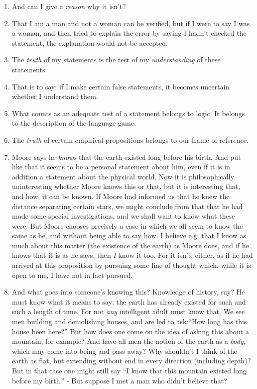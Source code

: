 \documentclass{book}
\begin{document}
\begin{enumerate}
\item
And can I give a \emph{reason} why it isn't?

\item
That I am a man and not a woman can be verified, but if I were to say I was a
woman, and then tried to explain the error by saying I hadn't checked the
statement, the explanation would not be accepted.

\item
The \emph{truth} of my statements is the test of my \emph{understanding} of
these statements.

\item
That is to say: if I make certain false statements, it becomes uncertain
whether I understand them.

\item
What counts as an adequate test of a statement belongs to logic. It belongs to
the description of the language-game.

\item
The \emph{truth} of certain empirical propositions belongs to our frame of
reference.

\item
Moore says he \emph{knows} that the earth existed long before his birth. And
put like that it seems to be a personal statement about him, even if it is in
addition a statement about the physical world. Now it is philosophically
uninteresting whether Moore knows this or that, but it is interesting that, and
how, it can be known. If Moore had informed us that he knew the distance
separating certain stars, we might conclude from that that he had made some
special investigations, and we shall want to know what these were. But Moore
chooses precisely a case in which we all seem to know the same as he, and
without being able to say how. I believe e.g. that I know as much about this
matter (the existence of the earth) as Moore does, and if he knows that it is
as he says, then \emph{I} know it too. For it isn't, either, as if he had
arrived at this proposition by pursuing some line of thought which, while it is
open to me, I have not in fact pursued.

\item
And what goes into someone's knowing this? Knowledge of history, say? He must
know what it means to say: the earth has already existed for such and such a
length of time. For not \emph{any} intelligent adult must know that. We see men
building and demolishing houses, and are led to ask:``How long has this house
been here?'' But how does one come on the idea of asking this about a mountain,
for example? And have all men the notion of the earth as a \emph{body}, which
may come into being and pass away? Why shouldn't I think of the earth as flat,
but extending without end in every direction (including depth)? But in that
case one might still say ``I know that this mountain existed long before my
birth.'' - But suppose I met a man who didn't believe that?


\end{enumerate}
\end{document}
